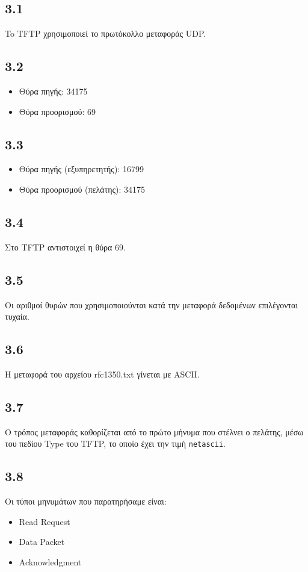 		\subsection*{3.1}
			To TFTP χρησιμοποιεί το πρωτόκολλο μεταφοράς UDP.
		
		\subsection*{3.2}
			\begin{itemize}
				\item Θύρα πηγής: 34175
				\item Θύρα προορισμού: 69 
			\end{itemize}
		
		\subsection*{3.3}
			\begin{itemize}
				\item Θύρα πηγής (εξυπηρετητής): 16799
				\item Θύρα προορισμού (πελάτης): 34175
			\end{itemize}
		
		\subsection*{3.4}
			Στο TFTP αντιστοιχεί η θύρα 69.
		
		\subsection*{3.5}
			Οι αριθμοί θυρών που χρησιμοποιούνται κατά την μεταφορά δεδομένων επιλέγονται τυχαία.
		
		\subsection*{3.6}
			Η μεταφορά του αρχείου rfc1350.txt γίνεται με ASCII.
		
		\subsection*{3.7}
			Ο τρόπος μεταφοράς καθορίζεται από το πρώτο μήνυμα που στέλνει ο πελάτης, μέσω του πεδίου Type του TFTP, το οποίο έχει την τιμή \verb|netascii|. 
		
		\subsection*{3.8}
			Οι τύποι μηνυμάτων που παρατηρήσαμε είναι: 
			\begin{itemize}
				\item Read Request
				\item Data Packet
				\item Acknowledgment
			\end{itemize}
		
